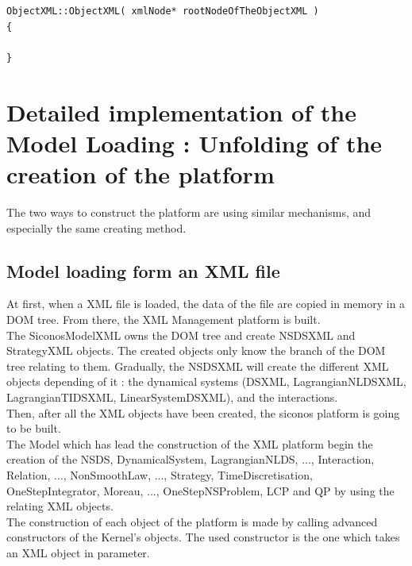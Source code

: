 \begin{verbatim}


ObjectXML::ObjectXML( xmlNode* rootNodeOfTheObjectXML ) 
{

}
\end{verbatim}
\clearpage
\section{Detailed implementation of the Model Loading : Unfolding of the creation of the platform}
The two ways to construct the platform are using similar mechanisms, and especially the same creating
method.



\subsection{Model loading form an XML file}


At first, when a XML file is loaded, the data of the file are copied in memory in a DOM tree. From
there, the XML Management platform is built.\\
The SiconosModelXML owns the DOM tree and create NSDSXML and StrategyXML objects. The created objects
only know the branch of the DOM tree relating to them. Gradually, the NSDSXML will create the
different XML objects depending of it : the dynamical systems (DSXML, LagrangianNLDSXML, LagrangianTIDSXML,
LinearSystemDSXML), and the interactions.\\
Then, after all the XML objects have been created, the \ac{siconos} platform is going to be built.\\
The Model which has lead the construction of the XML platform begin the creation of the NSDS,
DynamicalSystem, LagrangianNLDS, ..., Interaction, Relation, ..., NonSmoothLaw, ..., Strategy,
TimeDiscretisation, OneStepIntegrator, Moreau, ..., OneStepNSProblem, LCP and QP by using the
relating XML objects.\\
The construction of each object of the platform is made by calling advanced constructors of the Kernel's objects. The used constructor is the one which takes an XML object in parameter.\\


